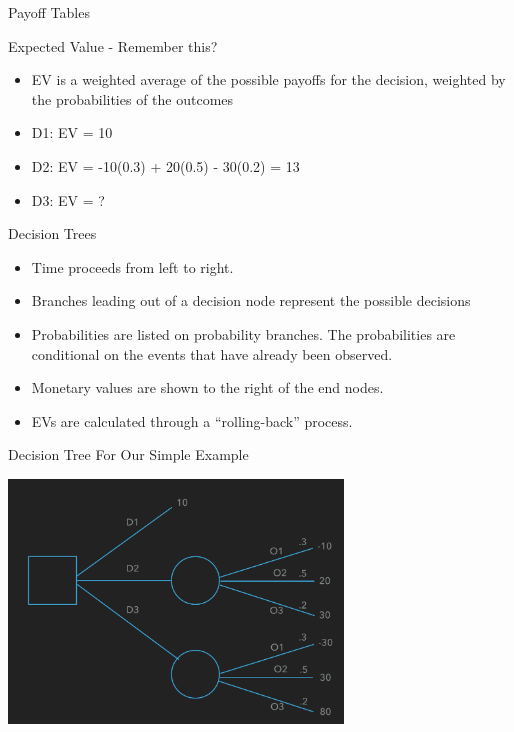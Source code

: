 \documentclass{beamer}\usepackage[]{graphicx}\usepackage[]{color}
\begin{document}
\begin{darkframes}
\begin{frame}[fragile]{Payoff Tables}
    \end{frame}


    \begin{frame}[fragile]{Expected Value - Remember this?}
      \fontsize{10}{10}\selectfont  
         \begin{itemize}
            \item EV is a weighted average of the possible payoffs for the decision,
            weighted by the probabilities of the outcomes
            \item D1: EV = 10
            \item D2: EV = -10(0.3) + 20(0.5) - 30(0.2) = 13 
            \item D3: EV = ?
        \end{itemize}    

      \lc %
    \end{frame}


    \begin{frame}[fragile]{Decision Trees}
      \fontsize{10}{10}\selectfont 
          \begin{itemize}
            \item Time proceeds from left to right.
            \item Branches leading out of a decision node represent the possible decisions
            \item Probabilities are listed on probability branches. The probabilities are conditional on the events that have already been observed.
            \item Monetary values are shown to the right of the end nodes.
            \item EVs are calculated through a ``rolling-back'' process.
          \end{itemize}  
    \end{frame}


    \begin{frame}[fragile]{Decision Tree For Our Simple Example}
      \fontsize{10}{10}\selectfont 
      \begin{center}
      \includegraphics[width=3.5in]{DecisionTree} 
      \end{center}
    \end{frame}     



\end{darkframes}
\end{document}
